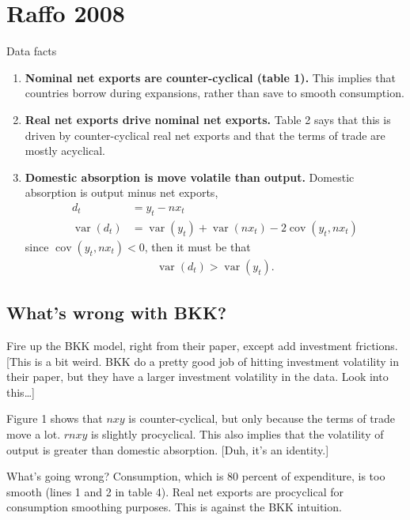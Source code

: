 \documentclass[11pt,pdftex,twoside,letterpaper]{exam}
\DeclareMathOperator{\cov}{\mathrm{cov}}
\DeclareMathOperator{\var}{\mathrm{var}}
\begin{document}
\section{Raffo 2008}
Data facts
\begin{enumerate}
\item \textbf{Nominal net exports are counter-cyclical (table 1).} This implies that countries borrow during expansions, rather than save to smooth consumption.

\item \textbf{Real net exports drive nominal net exports.} Table 2 says that this is driven by counter-cyclical real net exports and that the terms of trade are mostly acyclical.

\item \textbf{Domestic absorption is move volatile than output.} Domestic absorption is output minus net exports,
\begin{align}
  d_t &= y_t-nx_t\\
  \var(d_t) &= \var(y_t) + \var(nx_t) - 2\cov(y_t,nx_t)
\end{align}
since $\cov(y_t,nx_t)<0$, then it must be that
\begin{align}
  \var(d_t) > \var(y_t).
\end{align}
 \end{enumerate}

 \subsection{What's wrong with BKK?}
 Fire up the BKK model, right from their paper, except add investment frictions. [This is a bit weird. BKK do a pretty good job of hitting investment volatility in their paper, but they have a larger investment volatility in the data. Look into this\ldots]

 Figure 1 shows that $nxy$ is counter-cyclical, but only because the terms of trade move a lot. $rnxy$ is slightly procyclical. This also implies that the volatility of output is greater than domestic absorption. [Duh, it's an identity.]

 What's going wrong? Consumption, which is 80 percent of expenditure, is too smooth (lines 1 and 2 in table 4). Real net exports are procyclical for consumption smoothing purposes. This is against the BKK intuition.
\end{document}
